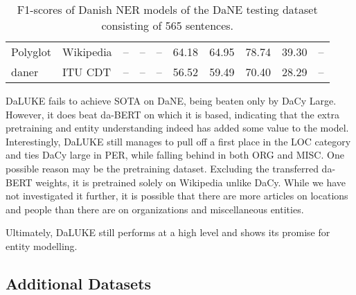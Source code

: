 \documentclass[main.tex]{subfiles}
\begin{document}
\begin{table}[H]
\begin{center}
\begin{tabular}{l l | c c c c | c c c c}
                        Polyglot      & Wikipedia & --             & --             & --             & 64.18                        & 64.95          & 78.74          & 39.30          & -- \\
                        daner         & ITU CDT   & --             & --             & --             & 56.52                        & 59.49          & 70.40          & 28.29          & -- \\
                \end{tabular}
        \end{center}
        \caption{F1\pro-scores of Danish NER models of the DaNE testing dataset consisting of 565 sentences.}
        \label{tab:DaNE}
\end{table}\noindent
DaLUKE fails to achieve SOTA on DaNE, being beaten only by DaCy Large.
However, it does beat da-BERT on which it is based, indicating that the extra pretraining and entity understanding indeed has added some value to the model.
Interestingly, DaLUKE still manages to pull off a first place in the LOC category and ties DaCy large in PER, while falling behind in both ORG and MISC.
One possible reason may be the pretraining dataset.
Excluding the transferred da-BERT weights, it is pretrained solely on Wikipedia unlike DaCy.
While we have not investigated it further, it is possible that there are more articles on locations and people than there are on organizations and miscellaneous entities.

Ultimately, DaLUKE still performs at a high level and shows its promise for entity modelling.

\subsection{Additional Datasets}



\end{document}
